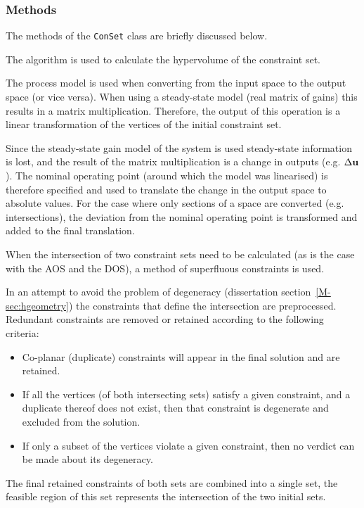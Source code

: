 \subsubsection{Methods}
The methods of the \texttt{ConSet} class are briefly discussed below.

The \qhull algorithm is used to calculate the hypervolume of the constraint set.

The process model is used when converting from the input space to the output space (or vice versa).
When using a steady-state model (real matrix of gains) this results in a matrix multiplication.
Therefore, the output of this operation is a linear transformation of the vertices of the initial constraint set.

Since the steady-state gain model of the system is used steady-state information is lost, and the result of the matrix multiplication is a change in outputs (e.g. $\Delta{\bf {u}}$).
The nominal operating point (around which the model was linearised) is therefore specified and used to translate the change in the output space to absolute values.
For the case where only sections of a space are converted (e.g. intersections), the deviation from the nominal operating point is transformed and added to the final translation.  

When the intersection of two constraint sets need to be calculated (as is the case with the AOS and the DOS), a method of superfluous constraints is used.

In an attempt to avoid the problem of degeneracy (dissertation section~\ref{M-sec:hgeometry}) the constraints that define the intersection are preprocessed.
Redundant constraints are removed or retained according to the following criteria:
\begin{itemize}
\item Co-planar (duplicate) constraints will appear in the final solution and are retained.
\item If all the vertices (of both intersecting sets) satisfy a given constraint, and a duplicate thereof does not exist, then that constraint is degenerate and excluded from the solution.
\item If only a subset of the vertices violate a given constraint, then no verdict can be made about its degeneracy.
\end{itemize}
The final retained constraints of both sets are combined into a single set, the feasible region of this set represents the intersection of the two initial sets.

